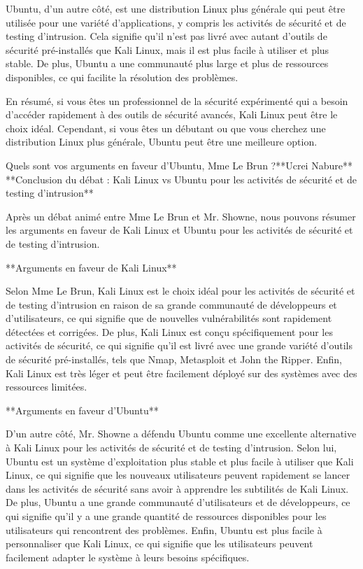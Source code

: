 Ubuntu, d'un autre côté, est une distribution Linux plus générale qui peut être utilisée pour une variété d'applications, y compris les activités de sécurité et de testing d'intrusion. Cela signifie qu'il n'est pas livré avec autant d'outils de sécurité pré-installés que Kali Linux, mais il est plus facile à utiliser et plus stable. De plus, Ubuntu a une communauté plus large et plus de ressources disponibles, ce qui facilite la résolution des problèmes.

En résumé, si vous êtes un professionnel de la sécurité expérimenté qui a besoin d'accéder rapidement à des outils de sécurité avancés, Kali Linux peut être le choix idéal. Cependant, si vous êtes un débutant ou que vous cherchez une distribution Linux plus générale, Ubuntu peut être une meilleure option.

Quels sont vos arguments en faveur d'Ubuntu, Mme Le Brun ?**Ucrei Nabure**
**Conclusion du débat : Kali Linux vs Ubuntu pour les activités de sécurité et de testing d'intrusion**

Après un débat animé entre Mme Le Brun et Mr. Showne, nous pouvons résumer les arguments en faveur de Kali Linux et Ubuntu pour les activités de sécurité et de testing d'intrusion.

**Arguments en faveur de Kali Linux**

Selon Mme Le Brun, Kali Linux est le choix idéal pour les activités de sécurité et de testing d'intrusion en raison de sa grande communauté de développeurs et d'utilisateurs, ce qui signifie que de nouvelles vulnérabilités sont rapidement détectées et corrigées. De plus, Kali Linux est conçu spécifiquement pour les activités de sécurité, ce qui signifie qu'il est livré avec une grande variété d'outils de sécurité pré-installés, tels que Nmap, Metasploit et John the Ripper. Enfin, Kali Linux est très léger et peut être facilement déployé sur des systèmes avec des ressources limitées.

**Arguments en faveur d'Ubuntu**

D'un autre côté, Mr. Showne a défendu Ubuntu comme une excellente alternative à Kali Linux pour les activités de sécurité et de testing d'intrusion. Selon lui, Ubuntu est un système d'exploitation plus stable et plus facile à utiliser que Kali Linux, ce qui signifie que les nouveaux utilisateurs peuvent rapidement se lancer dans les activités de sécurité sans avoir à apprendre les subtilités de Kali Linux. De plus, Ubuntu a une grande communauté d'utilisateurs et de développeurs, ce qui signifie qu'il y a une grande quantité de ressources disponibles pour les utilisateurs qui rencontrent des problèmes. Enfin, Ubuntu est plus facile à personnaliser que Kali Linux, ce qui signifie que les utilisateurs peuvent facilement adapter le système à leurs besoins spécifiques.

